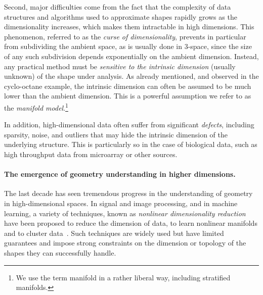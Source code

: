 Second, major difficulties come from the fact that the complexity of data structures and algorithms used to approximate shapes rapidly grows as the dimensionality increases, which makes them intractable in high dimensions.  This phenomenon, referred to as the {\em curse of dimensionality}, prevents  in particular from subdividing the ambient space, as is usually done in 3-space, since the size of any such subdivision depends exponentially on the ambient dimension. Instead, any practical method must be {\em sensitive to the intrinsic dimension} (usually unknown) of the shape under analysis. As already mentioned, and observed in the cyclo-octane example, the intrinsic dimension can often be assumed to be much lower than the ambient dimension. This is a powerful assumption we refer to as the {\em manifold model}.\footnote{We use the term manifold in a rather liberal way, including stratified manifolds.} %


In addition, high-dimensional data often suffer from significant {\em defects}, including sparsity, noise, and outliers that may hide the intrinsic dimension of the underlying structure. This is particularly so in the case of biological data, such as high throughput data from microarray or other sources. %
\vspace{-1mm}

\paragraph{The emergence of geometry understanding in higher dimensions.}
The last decade has seen tremendous progress in  the understanding of geometry in high-dimensional spaces. %
In signal and image processing, and in machine learning, a variety of techniques, known as {\em nonlinear dimensionality reduction} have been proposed to reduce the dimension of data, to learn nonlinear manifolds and to cluster data~\cite{lv-nldr-2007}. %
Such techniques are widely used but have limited guarantees and 
impose strong constraints on the dimension or topology of the shapes they can successfully handle. 

